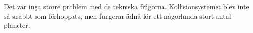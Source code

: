 Det var inga större problem med de tekniska frågorna.
Kollisionsystemet blev inte så snabbt som förhoppats,
men fungerar ädnå för ett någorlunda stort antal planeter.


